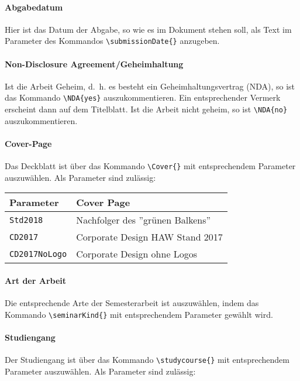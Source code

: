 \paragraph{Abgabedatum} Hier ist das Datum der Abgabe, so wie es im Dokument stehen soll, als Text im Parameter des Kommandos \texttt{\textbackslash submissionDate\{\}} anzugeben.

\paragraph{Non-Disclosure Agreement/Geheimhaltung} Ist die Arbeit Geheim, d.~h. es besteht ein Geheimhaltungsvertrag (NDA), so ist das Kommando \texttt{\textbackslash NDA\{yes\}} auszukommentieren. Ein entsprechender Vermerk erscheint dann auf dem Titelblatt. Ist die Arbeit nicht geheim, so ist \texttt{\textbackslash NDA\{no\}} auszukommentieren.

\paragraph{Cover-Page} Das Deckblatt ist über das Kommando
\texttt{\textbackslash Cover\{\}} mit entsprechendem Parameter
auszuwählen. Als Parameter sind zulässig:

\begin{center}
  \begin {tabular}{ll}
    Parameter & Cover Page \\
    \hline
    \texttt{Std2018} & Nachfolger des ''grünen Balkens'' \\
    \texttt{CD2017} & Corporate Design HAW Stand 2017 \\
    \texttt{CD2017NoLogo} & Corporate Design ohne Logos \\
  \end{tabular}
\end{center}

\paragraph{Art der Arbeit} Die entsprechende Arte der Semesterarbeit ist auszuwählen, indem das Kommando
\texttt{\textbackslash seminarKind\{\}} mit entsprechendem Parameter gewählt wird. 

\paragraph{Studiengang} Der Studiengang ist über das Kommando
\texttt{\textbackslash studycourse\{\}} mit entsprechendem Parameter
auszuwählen. Als Parameter sind zulässig:

